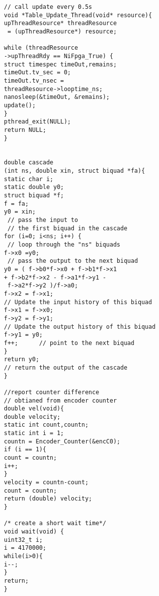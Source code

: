 \begin{verbatim}
// call update every 0.5s
void *Table_Update_Thread(void* resource){
upThreadResource* threadResource
 = (upThreadResource*) resource;

while (threadResource
->upThreadRdy == NiFpga_True) {
struct timespec timeOut,remains;
timeOut.tv_sec = 0;
timeOut.tv_nsec = 
threadResource->looptime_ns;
nanosleep(&timeOut, &remains);
update();
}
pthread_exit(NULL);
return NULL;
}


double cascade
(int ns, double xin, struct biquad *fa){
static char i;
static double y0;
struct biquad *f;
f = fa;
y0 = xin;            	
 // pass the input to 
 // the first biquad in the cascade
for (i=0; i<ns; i++) {   
 // loop through the "ns" biquads
f->x0 =y0;      	  
 // pass the output to the next biquad
y0 = ( f->b0*f->x0 + f->b1*f->x1 
+ f->b2*f->x2 - f->a1*f->y1 -
 f->a2*f->y2 )/f->a0;
f->x2 = f->x1;  	 
// Update the input history of this biquad
f->x1 = f->x0;
f->y2 = f->y1;  
// Update the output history of this biquad
f->y1 = y0;
f++;      // point to the next biquad
}
return y0; 
// return the output of the cascade
}

//report counter difference 
// obtianed from encoder counter
double vel(void){
double velocity;
static int count,countn;
static int i = 1;
countn = Encoder_Counter(&encC0);
if (i == 1){
count = countn;
i++;
}
velocity = countn-count;
count = countn;
return (double) velocity;
}

/* create a short wait time*/
void wait(void) {
uint32_t i;
i = 4170000;
while(i>0){
i--;
}
return;
}



\end{verbatim}